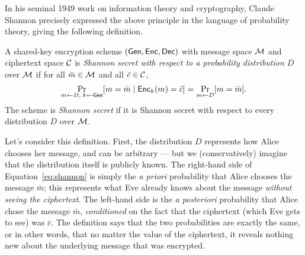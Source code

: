 \documentclass[11pt]{article}
\begin{document}
In his seminal 1949 work on information theory and cryptography,
Claude Shannon precisely expressed the above principle in the language
of probability theory, giving the following definition.

\begin{definition}
  \label{def:shannon-secrecy}
  A shared-key encryption scheme $(\mathsf{Gen},\mathsf{Enc},\mathsf{Dec})$ with
  message space $\mathcal{M}$ and ciphertext space $\mathcal{C}$ is
  \emph{Shannon secret with respect to a probability distribution $D$}
  over $\mathcal{M}$ if for all $\bar{m} \in \mathcal{M}$ and all $\bar{c}
  \in \mathcal{C}$,
  \begin{equation}
    \label{eq:shannon}
    \Pr_{m \gets D,\; k \gets \mathsf{Gen}}[m = \bar{m}\; |\;
    \mathsf{Enc}_{k}(m) = \bar{c} ] = \Pr_{m \gets D}[ m = \bar{m} ].
  \end{equation}
  The scheme is \emph{Shannon secret} if it is Shannon secret with
  respect to every distribution $D$ over $\mathcal{M}$.
\end{definition}

Let's consider this definition.  First, the distribution $D$
represents how Alice chooses her message, and can be arbitrary --- but
we (conservatively) imagine that the distribution itself is publicly
known.  The right-hand side of Equation~\eqref{eq:shannon} is simply
the \textit{a priori} probability that Alice chooses the message
$\bar{m}$; this represents what Eve already knows about the message
\emph{without seeing the ciphertext}.  The left-hand side is the
\textit{a posteriori} probability that Alice chose the message
$\bar{m}$, \emph{conditioned} on the fact that the ciphertext (which
Eve gets to see) was $\bar{c}$.  The definition says that the two
probabilities are exactly the same, or in other words, that no matter
the value of the ciphertext, it reveals nothing new about the
underlying message that was encrypted.
\end{document}
